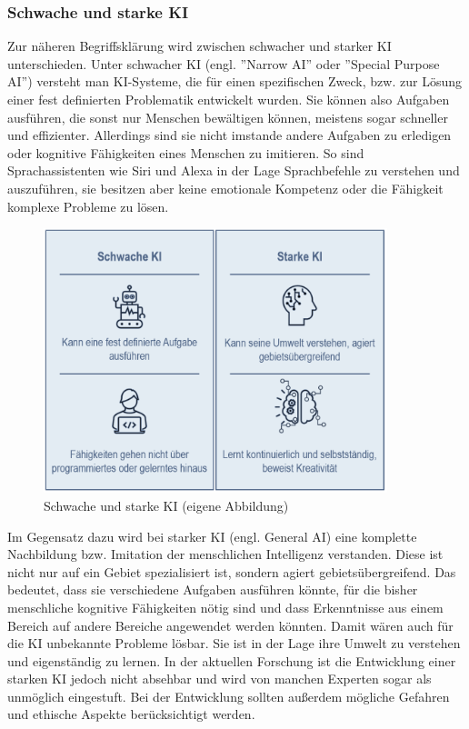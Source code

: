 \documentclass[a4paper,12pt, german]{report}
\begin{document}
\subsubsection{Schwache und starke KI}


Zur näheren Begriffsklärung wird zwischen schwacher und starker KI unterschieden. Unter schwacher KI (engl. ''Narrow AI'' oder ''Special Purpose AI'') versteht man KI-Systeme, die für einen spezifischen Zweck, bzw. zur Lösung einer fest definierten Problematik entwickelt wurden. Sie können also Aufgaben ausführen, die sonst nur Menschen bewältigen können, meistens sogar schneller und effizienter. Allerdings sind sie nicht imstande andere Aufgaben zu erledigen oder kognitive Fähigkeiten eines Menschen zu imitieren. So sind Sprachassistenten wie Siri und Alexa in der Lage Sprachbefehle zu verstehen und auszuführen, sie besitzen aber keine emotionale Kompetenz oder die Fähigkeit komplexe Probleme zu lösen.\cite{01}\cite{15}

\begin{figure}[H]
  \center
 \includegraphics[width=10cm]{images/starkeschwacheKI.png}
  \caption[Schwache und Starke KI]{Schwache und starke KI (eigene Abbildung)}
\end{figure}
Im Gegensatz dazu wird bei starker KI (engl. General AI) eine komplette Nachbildung bzw. Imitation der menschlichen Intelligenz verstanden. Diese ist nicht nur auf ein Gebiet spezialisiert ist, sondern agiert gebietsübergreifend. Das bedeutet, dass sie verschiedene Aufgaben ausführen könnte, für die bisher menschliche kognitive Fähigkeiten nötig sind und dass Erkenntnisse aus einem Bereich auf andere Bereiche angewendet werden könnten. Damit wären auch für die KI unbekannte Probleme lösbar. Sie ist in der Lage ihre Umwelt zu verstehen und eigenständig zu lernen. In der aktuellen Forschung ist die Entwicklung einer starken KI jedoch nicht absehbar und wird von manchen Experten sogar als unmöglich eingestuft. Bei der Entwicklung sollten außerdem mögliche Gefahren und ethische Aspekte berücksichtigt werden. 
\end{document}
